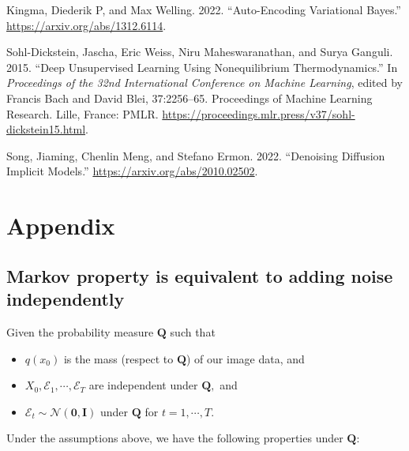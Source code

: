 \documentclass[
]{article}
\providecommand{\tightlist}{%
  \setlength{\itemsep}{0pt}\setlength{\parskip}{0pt}}\usepackage{longtable,booktabs,array}
\newlength{\cslhangindent}
\newenvironment{CSLReferences}[2] %
 {\begin{list}{}{%
  \setlength{\itemindent}{0pt}
  \setlength{\leftmargin}{0pt}
  \setlength{\parsep}{0pt}
  \ifodd #1
   \setlength{\leftmargin}{\cslhangindent}
   \setlength{\itemindent}{-1\cslhangindent}
  \fi
  \setlength{\itemsep}{#2\baselineskip}}}
 {\end{list}}
\theoremstyle{remark}
\begin{document}
\begin{CSLReferences}{1}{0}
Kingma, Diederik P, and Max Welling. 2022. {``Auto-Encoding Variational
Bayes.''} \url{https://arxiv.org/abs/1312.6114}.

Sohl-Dickstein, Jascha, Eric Weiss, Niru Maheswaranathan, and Surya
Ganguli. 2015. {``Deep Unsupervised Learning Using Nonequilibrium
Thermodynamics.''} In \emph{Proceedings of the 32nd International
Conference on Machine Learning}, edited by Francis Bach and David Blei,
37:2256--65. Proceedings of Machine Learning Research. Lille, France:
PMLR. \url{https://proceedings.mlr.press/v37/sohl-dickstein15.html}.

Song, Jiaming, Chenlin Meng, and Stefano Ermon. 2022. {``Denoising
Diffusion Implicit Models.''} \url{https://arxiv.org/abs/2010.02502}.

\end{CSLReferences}

\newpage{}

\setcounter{section}{0}
\renewcommand{\thesection}{\Alph{section}}
\setcounter{table}{0}
\renewcommand{\thetable}{A\arabic{table}}
\setcounter{figure}{0}
\renewcommand{\thefigure}{A\arabic{figure}}

\section{Appendix}\label{appendix}

\subsection{Markov property is equivalent to adding noise
independently}\label{sec-markov-equivalent}

Given the probability measure \(\mathbf{Q}\) such that

\begin{itemize}
\tightlist
\item
  \(q(x_0)\) is the mass (respect to \(\mathbf{Q}\)) of our image data,
  and
\item
  \(X_0,\mathcal{E}_1,\cdots,\mathcal{E}_T\) are independent under
  \(\mathbf{Q},\) and
\item
  \(\mathcal{E}_t\sim \mathcal{N}(\mathbf{0},\mathbf{I})\) under
  \(\mathbf{Q}\) for \(t=1,\cdots, T.\)
\end{itemize}

Under the assumptions above, we have the following properties under
\(\mathbf{Q}\):
\end{document}

